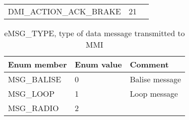 \documentclass{template/openetcs_article}
\begin{document}
\begin{longtable}{|l|l|l|}
	&	\begin{minipage}[t]{0.30\linewidth} \end{minipage}\\
	\hline
		\begin{minipage}[t]{0.60\linewidth}	DMI\_ACTION\_ACK\_BRAKE\end{minipage}
	&	\begin{minipage}[t]{0.15\linewidth} 21 	\end{minipage}
	&	\begin{minipage}[t]{0.30\linewidth} \end{minipage}\\
		\hline
\end{longtable}

\newpage
\begin{longtable}{|l|l|l|}
	\caption{eMSG\_TYPE, type of data message transmitted to MMI}\\
	\hline
		\begin{minipage}[t]{0.60\linewidth} \textbf{Enum member}	\end{minipage}
	&	\begin{minipage}[t]{0.15\linewidth} \textbf{Enum value}	\end{minipage} 
	&	\begin{minipage}[t]{0.30\linewidth} \textbf{Comment} \end{minipage} \\
	\hline
		\begin{minipage}[t]{0.60\linewidth}	MSG\_BALISE\end{minipage}
	&	\begin{minipage}[t]{0.15\linewidth} 0 	\end{minipage}
	&	\begin{minipage}[t]{0.30\linewidth} Balise message\end{minipage} \\
	\hline
		\begin{minipage}[t]{0.60\linewidth}	MSG\_LOOP\end{minipage}
	&	\begin{minipage}[t]{0.15\linewidth} 1 	\end{minipage}
	&	\begin{minipage}[t]{0.30\linewidth} Loop message\end{minipage} \\
	\hline
		\begin{minipage}[t]{0.60\linewidth}	MSG\_RADIO\end{minipage}
	&	\begin{minipage}[t]{0.15\linewidth} 2 	\end{minipage}

\end{longtable}
\end{document}
